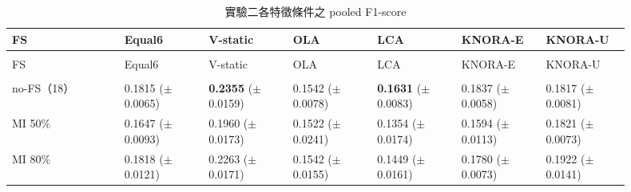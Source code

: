 \begingroup
\small{}\setlength{\tabcolsep}{3pt}
\setlength{\LTleft}{\fill}\setlength{\LTright}{\fill}
\begin{longtable}{@{}>{\raggedright\arraybackslash}p{0.16\linewidth}>{\raggedright\arraybackslash}p{0.123\linewidth}>{\raggedright\arraybackslash}p{0.123\linewidth}>{\raggedright\arraybackslash}p{0.123\linewidth}>{\raggedright\arraybackslash}p{0.123\linewidth}>{\raggedright\arraybackslash}p{0.123\linewidth}>{\raggedright\arraybackslash}p{0.123\linewidth}@{}}
\caption{實驗二各特徵條件之 pooled F1-score}\label{tab:results-fs-f1}\\
\toprule
FS & Equal6 & V-static & OLA & LCA & KNORA-E & KNORA-U \\
\midrule\endfirsthead
\multicolumn{7}{c}{表~\thetable（續）}\\
\toprule
FS & Equal6 & V-static & OLA & LCA & KNORA-E & KNORA-U \\
\midrule\endhead
\midrule\multicolumn{7}{r}{續下頁}\\\endfoot
\bottomrule\endlastfoot
no-FS（18） & \shortstack[l]{0.1815\\{\scriptsize(\(\pm\)0.0065)}} & \shortstack[l]{\textbf{0.2355}\\{\scriptsize(\(\pm\)0.0159)}} & \shortstack[l]{0.1542\\{\scriptsize(\(\pm\)0.0078)}} & \shortstack[l]{\textbf{0.1631}\\{\scriptsize(\(\pm\)0.0083)}} & \shortstack[l]{0.1837\\{\scriptsize(\(\pm\)0.0058)}} & \shortstack[l]{0.1817\\{\scriptsize(\(\pm\)0.0081)}} \\
MI 50\% & \shortstack[l]{0.1647\\{\scriptsize(\(\pm\)0.0093)}} & \shortstack[l]{0.1960\\{\scriptsize(\(\pm\)0.0173)}} & \shortstack[l]{0.1522\\{\scriptsize(\(\pm\)0.0241)}} & \shortstack[l]{0.1354\\{\scriptsize(\(\pm\)0.0174)}} & \shortstack[l]{0.1594\\{\scriptsize(\(\pm\)0.0113)}} & \shortstack[l]{0.1821\\{\scriptsize(\(\pm\)0.0073)}} \\
MI 80\% & \shortstack[l]{0.1818\\{\scriptsize(\(\pm\)0.0121)}} & \shortstack[l]{0.2263\\{\scriptsize(\(\pm\)0.0171)}} & \shortstack[l]{0.1542\\{\scriptsize(\(\pm\)0.0155)}} & \shortstack[l]{0.1449\\{\scriptsize(\(\pm\)0.0161)}} & \shortstack[l]{0.1780\\{\scriptsize(\(\pm\)0.0073)}} & \shortstack[l]{0.1922\\{\scriptsize(\(\pm\)0.0141)}} \\

\end{longtable}
